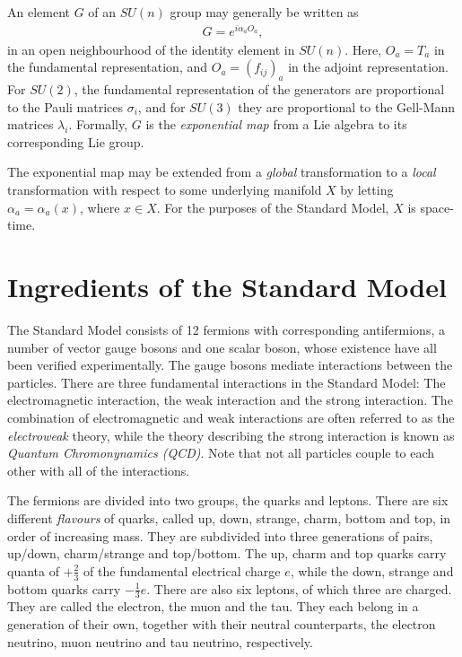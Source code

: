 \documentclass[twoside,english]{uiofysmaster}
\begin{document}
An element $G$ of an $SU(n)$ group may generally be written as
\begin{align}
	G = e^{i\alpha_a O_a},\label{eq:global_gauge_transformation}
\end{align}
in an open neighbourhood of the identity element in $SU(n)$. Here, $O_a = T_a$ in the fundamental representation, and $O_a = (f_{ij})_{a}$ in the adjoint representation. For $SU(2)$, the fundamental representation of the generators are proportional to the Pauli matrices $\sigma_i$, and for $SU(3)$ they are proportional to the Gell-Mann matrices $\lambda_i$. Formally, $G$ is the {\it exponential map} from a Lie algebra to its corresponding Lie group. 

The exponential map may be extended from a {\it global} transformation to a {\it local} transformation with respect to some underlying manifold $X$ by letting $\alpha_a = \alpha_a(x)$, where $x\in X$. For the purposes of the Standard Model, $X$ is space-time.




\section{Ingredients of the Standard Model}

The Standard Model consists of 12 fermions with corresponding antifermions, a number of vector gauge bosons and one scalar boson, whose existence have all been verified experimentally. The gauge bosons mediate interactions between the particles. There are three fundamental interactions in the Standard Model: The electromagnetic interaction, the weak interaction and the strong interaction. The combination of electromagnetic and weak interactions are often referred to as the {\it electroweak} theory, while the theory describing the strong interaction is known as {\it Quantum Chromonynamics (QCD)}. Note that not all particles couple to each other with all of the interactions. 

The fermions are divided into two groups, the quarks and leptons. There are six different {\it flavours} of quarks, called up, down, strange, charm, bottom and top, in order of increasing mass. They are subdivided into three generations of pairs, up/down, charm/strange and top/bottom. The up, charm and top quarks carry quanta of $+\frac{2}{3}$ of the fundamental electrical charge $e$, while the down, strange and bottom quarks carry $-\frac{1}{3}e$. There are also six leptons, of which three are charged. They are called the electron, the muon and the tau. They each belong in a generation of their own, together with their neutral counterparts, the electron neutrino, muon neutrino and tau neutrino, respectively. 
\end{document}
